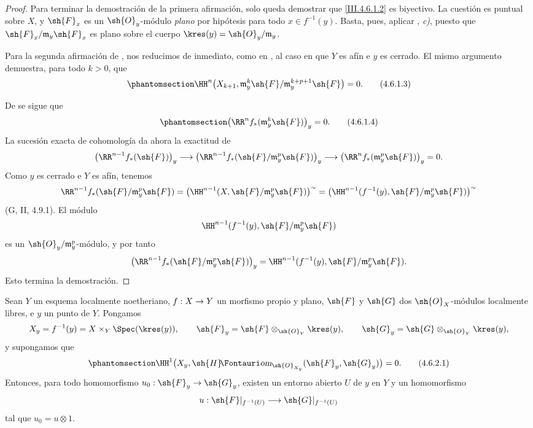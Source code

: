 \documentclass[oneside]{amsart}
\makeatletter
\newcommand{\ega@arrow}[2]{\mathchoice{#1}{#2}{#2}{#2}}
\renewcommand{\to}{\ega@arrow{\longrightarrow}{\rightarrow}}
\newcommand*{\ega@sheafop}[3]{\sh{#1}#2\textup{\kern-2.2pt{\Fontauri\slshape #3}}}
\newcommand*{\shHom}{\ega@sheafop{H}{}{om}}
\newcommand{\oldpage}[2][]{{\marginnote{\normalfont\textbf{#1}~|~#2}}\ignorespaces}
\let\EGAOriginalLabel\label
\renewcommand{\label}[1]{\phantomsection\EGAOriginalLabel{#1}}
\makeatother
\begin{document}
\begin{proof}
Para terminar la demostración de la primera afirmación, solo queda demostrar
que \eqref{III.4.6.1.2} es biyectivo. La cuestión es puntual sobre
$X$, y $\sh{F}_x$ es un $\sh{O}_y$-módulo \emph{plano} por hipótesis para
todo $x\in f^{-1}(y)$. Basta, pues, aplicar
, \emph{c)}, puesto que
$\sh{F}_x/\mathfrak m_y\sh{F}_x$ es plano sobre el cuerpo
$\kres(y)=\sh{O}_y/\mathfrak m_y$.

Para la segunda afirmación de , nos reducimos de inmediato, como
en , al caso en que $Y$ es afín e $y$ es
cerrado. El mismo argumento demuestra, para todo $k>0$, que
\[
\label{III.4.6.1.3}
  \HH^n\bigl(X_{k+1},
    \mathfrak m_y^k\sh{F}/
      \mathfrak m_y^{k+p+1}\sh{F}\bigr)=0.
  \tag{4.6.1.3}
\]

\oldpage[III]{141}

De  se sigue que
\[
\label{III.4.6.1.4}
  \bigl(\RR^n f_*(\mathfrak m_y^k\sh{F})\bigr)_y=0.
  \tag{4.6.1.4}
\]
La sucesión exacta de cohomología da ahora la exactitud de
\[
  \bigl(\RR^{n-1}f_*(\sh{F})\bigr)_y
  \longrightarrow
  \bigl(\RR^{n-1}f_*
    (\sh{F}/\mathfrak m_y^p\sh{F})\bigr)_y
  \longrightarrow
  \bigl(\RR^n f_*(\mathfrak m_y^p\sh{F})\bigr)_y=0.
\]
Como $y$ es cerrado e $Y$ es afín, tenemos
\[
  \RR^{n-1}f_*(\sh{F}/\mathfrak m_y^p\sh{F})
  =
  \bigl(\HH^{n-1}
    (X,\sh{F}/\mathfrak m_y^p\sh{F})\bigr)^{\sim}
  =
  \bigl(\HH^{n-1}
    (f^{-1}(y),\sh{F}/\mathfrak m_y^p\sh{F})\bigr)^{\sim}
\]
(G, II, 4.9.1). El módulo
\[
  \HH^{n-1}
    (f^{-1}(y),\sh{F}/\mathfrak m_y^p\sh{F})
\]
es un $\sh{O}_y/\mathfrak m_y^p$-módulo, y por tanto
\[
  \bigl(\RR^{n-1}f_*
    (\sh{F}/\mathfrak m_y^p\sh{F})\bigr)_y
  =
  \HH^{n-1}
    (f^{-1}(y),\sh{F}/\mathfrak m_y^p\sh{F}).
\]
Esto termina la demostración.
\end{proof}

\begin{corollary}[4.6.2]
\label{III.4.6.2}
Sean $Y$ un esquema localmente noetheriano, $f:X\to Y$ un
morfismo propio y plano, $\sh{F}$ y $\sh{G}$ dos
$\sh{O}_X$-módulos localmente libres, e $y$ un punto de $Y$. Pongamos
\[
  X_y=f^{-1}(y)=X\times_Y\Spec(\kres(y)),\qquad
  \sh{F}_y=\sh{F}\otimes_{\sh{O}_Y}\kres(y),\qquad
  \sh{G}_y=\sh{G}\otimes_{\sh{O}_Y}\kres(y),
\]
y supongamos que
\[
\label{III.4.6.2.1}
  \HH^1\bigl(
    X_y,\shHom_{\sh{O}_{X_y}}(\sh{F}_y,\sh{G}_y)
  \bigr)=0.
  \tag{4.6.2.1}
\]
Entonces, para todo homomorfismo $u_0:\sh{F}_y\to\sh{G}_y$, existen
un entorno abierto $U$ de $y$ en $Y$ y un homomorfismo
\[
  u:\sh{F}|_{f^{-1}(U)}\longrightarrow
    \sh{G}|_{f^{-1}(U)}
\]
tal que $u_0=u\otimes1$.
\end{corollary}
\end{document}
